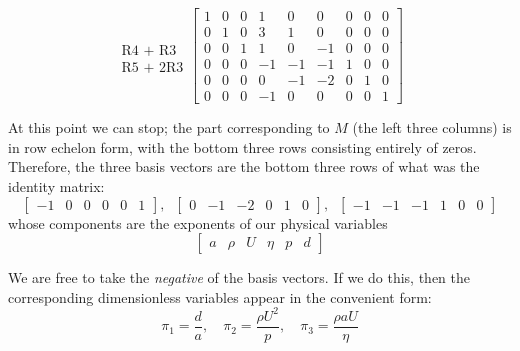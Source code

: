 \documentclass[12pt, a4paper, twoside, openright]{book}
\begin{document}
\begin{equation*}
\begin{matrix}
\\
\\
\\
\text{R4 + R3} \\
\text{R5 + 2R3} \\
\\
\end{matrix}
\begin{bmatrix}
1  &  0  &  0  &  1  &  0  &  0  &  0  &  0  &  0 \\
0  &  1  &  0  &  3  &  1  &  0  &  0  &  0  &  0 \\
0  &  0  &  1  &  1  &  0  & -1  &  0  &  0  &  0 \\
0  &  0  &  0  & -1  & -1  & -1  &  1  &  0  &  0 \\
0  &  0  &  0  &  0  & -1  & -2  &  0  &  1  &  0 \\
0  &  0  &  0  & -1  &  0  &  0  &  0  &  0  &  1
\end{bmatrix}
\end{equation*}

At this point we can stop; the part corresponding to $M$ (the left three columns) is in row echelon form, with the bottom three rows consisting entirely of zeros.  Therefore, the three basis vectors are the bottom three rows of what was the identity matrix:
\begin{equation*}
\begin{bmatrix}
-1 & 0 & 0 & 0 & 0 & 1
\end{bmatrix}
,\;\;
\begin{bmatrix}
0 & -1 & -2 & 0 & 1 & 0
\end{bmatrix}
,\;\;
\begin{bmatrix}
-1 & -1 & -1 & 1 & 0 & 0
\end{bmatrix}
\end{equation*}
whose components are the exponents of our physical variables
\begin{equation*}
\begin{bmatrix}
a & \rho & U & \eta & p & d
\end{bmatrix}
\end{equation*}

We are free to take the \emph{negative} of the basis vectors.  If we do this, then the corresponding dimensionless variables appear in the convenient form:
\begin{equation}
 \pi_1 = \frac{d}{a}, \quad \pi_2 = \frac{\rho U^2}{p}, \quad
 \pi_3 = \frac{\rho a U}{\eta}
\end{equation}
\end{document}
